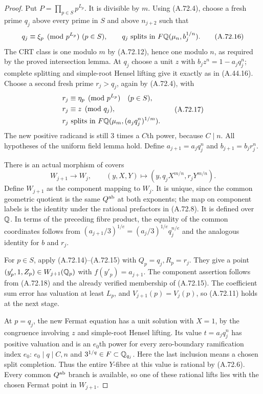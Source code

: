 \begin{proof}
Put $P=\prod_{p\in S}p^{L_p}$.
It is divisible by $m$.
Using (A.72.4), choose a fresh prime $q_j$ above every prime in
$S$ and above $n_{j+2}$ such that
\[
 q_j\equiv\xi_p\pmod {p^{L_p}}\ (p\in S),\qquad
 q_j\text{ splits in }F\Q(\mu_n,b_j^{1/n}).
\tag{A.72.16}
\]
The CRT class is one modulo $m$ by (A.72.12), hence one modulo
$n$, as required by the proved intersection lemma.
At $q_j$ choose a unit $z$ with
$b_jz^n=1-a_jq_j^n$; complete splitting and simple-root Hensel
lifting give it exactly as in (A.44.16).
Choose a second fresh prime $r_j>q_j$, again by (A.72.4), with
\[
 \begin{split}
 r_j&\equiv\eta_p\pmod {p^{L_p}}\quad(p\in S),\\
 r_j&\equiv z\pmod {q_j},\\
 r_j&\text{ splits in }
        F\mathbb Q(\mu_m,(a_jq_j^n)^{1/m}).
 \end{split}
\tag{A.72.17}
\]
The new positive radicand is still $3$ times a $C$th power,
because $C\mid n$.  All hypotheses of the uniform field lemma
hold.  Define $a_{j+1}=a_jq_j^n$ and $b_{j+1}=b_jr_j^n$.

There is an actual morphism of covers
\[
 W_{j+1}\longrightarrow W_j,\qquad
        (y,X,Y)\longmapsto(y,q_jX^{m/n},r_jY^{m/n}).
\tag{A.72.18}
\]
Define $W_{j+1}$ as the component mapping to $W_j$.
It is unique, since the common geometric quotient is the same
$Q^{\rm ab}$ at both exponents; the map on component labels is
the identity under the rational prefactors in (A.72.8).
It is defined over $\mathbb Q$.  In terms of the preceding fibre product,
the equality of the common coordinates follows from
$(a_{j+1}/3)^{1/e}=(a_j/3)^{1/e}q_j^{n/e}$
and the analogous identity for $b$ and $r_j$.

For $p\in S$, apply (A.72.14)--(A.72.15) with
$Q_p=q_j,R_p=r_j$.  They give a point
$(y'_p,1,Z_p)\in W_{j+1}(\mathbb Q_p)$ with
$f(y'_p)=a_{j+1}$.  The component assertion follows from
(A.72.18) and the already verified membership of (A.72.15).
The coefficient sum error has valuation at least $L_p$, and
$V_{j+1}(p)=V_j(p)$, so (A.72.11) holds at the next stage.

At $p=q_j$, the new Fermat equation has a unit solution with
$X=1$, by the congruence involving $z$ and simple-root Hensel
lifting.  Its value $t=a_jq_j^n$ has positive valuation and is
an $e_0$th power for every zero-boundary ramification index
$e_0$: $e_0\mid q\mid C,n$ and $3^{1/q}\in F\subset\mathbb Q_{q_j}$.
Here the last inclusion means a chosen split completion.
Thus the entire $Y$-fibre at this value is rational by (A.72.6).
Every common $Q^{\rm ab}$ branch is available, so one of these
rational lifts lies with the chosen Fermat point in $W_{j+1}$.


\end{proof}
